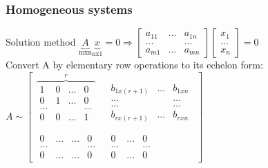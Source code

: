 \begin{frame}
	\frametitle{Homogeneous systems}
	\begin{block}{Solution method}
		$\underbrace{A}_\text{mxn}\underbrace{x}_\text{nx1}=0 \Rightarrow \begin{bmatrix}
		a_{11} & ... & a_{1n}\\
		... & & ...\\
		a_{m1} & ... & a_{mn}
		\end{bmatrix}\begin{bmatrix}
			x_1\\...\\x_n
		\end{bmatrix}=0$\\
		Convert A by elementary row operations to its echelon form: \\
		$A\sim\begin{bmatrix}
		\overbrace{\begin{matrix}
		1 & 0 &...& 0\\
		0 & 1 &... & 0\\
		... & & & ...\\
		0 & 0 &... & 1\\
		 & & &
		\end{matrix}}^r & \begin{matrix}
		b_{1x(r+1)} & ... & b_{1xn}\\
		... & & ...\\
		... & & ...\\
		b_{rx(r+1)} & ... & b_{rxn}\\
		 & & 
		\end{matrix}\\
		\begin{matrix}
		0 & ... & ... & 0\\
		... & & & ...\\
		0 & ... & ... & 0
		\end{matrix} & \begin{matrix}
		0 & ... & 0\\
		... & & ...\\
		0 & ... & 0
		\end{matrix}
		\end{bmatrix}$
	\end{block}
\end{frame}

